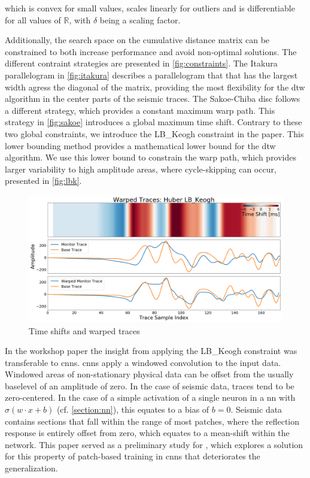 which is convex for small values, scales linearly for outliers and is differentiable for all values of $\mathbb{R}$, with $\delta$ being a scaling factor.

Additionally, the search space on the cumulative distance matrix can be constrained to both increase performance and avoid non-optimal solutions. The different contraint strategies are presented in \cref{fig:constraints}. The Itakura parallelogram \citep{Itakura1975} in \cref{fig:itakura} describes a parallelogram that that has the largest width agress the diagonal of the matrix, providing the most flexibility for the \ac{dtw} algorithm in the center parts of the seismic traces. The Sakoe-Chiba disc \citep{Sakoe1978} follows a different strategy, which provides a constant maximum warp path. This strategy in \cref{fig:sakoe} introduces a global maximum time shift. Contrary to these two global constraints, we introduce the LB\_Keogh \citep{keogh2005exact} constraint in the paper. This lower bounding method provides a mathematical lower bound for the \ac{dtw} algorithm. We use this lower bound to constrain the warp path, which provides larger variability to high amplitude areas, where cycle-skipping can occur, presented in \cref{fig:lbk}. 

\begin{figure}[!ht]
    \centering
    \includegraphics[width=\textwidth]{figures/time_shift_huber_lb_keogh.png}
    \caption{Time shifts and warped traces \citep[from][]{dramsch2019dtw}}
    \label{fig:time-shifts-warped}
\end{figure}

In the workshop paper  \citep{dramsch2018information} the insight from applying the LB\_Keogh constraint was transferable to \aclp{cnn}. \acp{cnn} apply a windowed convolution to the input data. Windowed areas of non-stationary physical data can be offset from the usually baselevel of an amplitude of zero. In the case of seismic data, traces tend to be zero-centered. In the case of a simple activation of a single neuron in a \ac{nn} with $\sigma(w\cdot x + b)$ (cf. \cref{section:nn}), this equates to a bias of $b=0$. Seismic data contains sections that fall within the range of most patches, where the reflection response is entirely offset from zero, which equates to a mean-shift within the network. This paper served as a preliminary study for \citet{dramsch2019complex}, which explores a solution for this property of patch-based training in \acp{cnn} that deteriorates the generalization.

